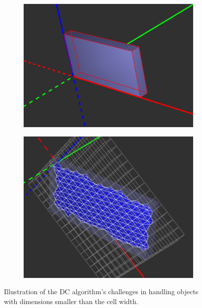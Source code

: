 \begin{figure}[H]
    \centering
    \begin{subfigure}{0.5\textwidth}
        \centering
        \includegraphics[height=0.7\textwidth, width=0.9\linewidth]{Figures/Thin-brick.png}
    \end{subfigure}%
    \begin{subfigure}{0.5\textwidth}
        \centering
        \includegraphics[height=0.7\textwidth, width=0.9\linewidth]{Figures/DC-thin-brick-mesh.png}
    \end{subfigure}
    \decoRule
    \caption{Illustration of the DC algorithm's challenges in handling objects with dimensions smaller than the cell width.}
    \label{fig:DC-analysis-thin-features}
\end{figure}


